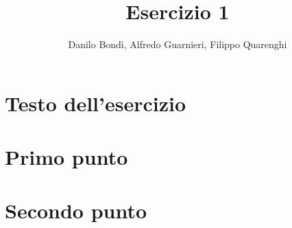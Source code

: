\documentclass[10pt, titlepage]{article}
\title{\textbf{Esercizio 1}}
\author{Danilo Bondì, Alfredo Guarnieri, Filippo Quarenghi}
\date{}
\begin{document}


\section*{Testo dell'esercizio}


\section*{Primo punto}


\section*{Secondo punto}

\end{document}
